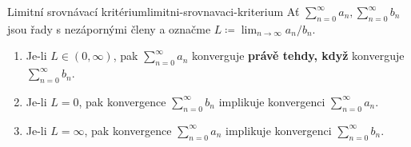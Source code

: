 \begin{theorem}{Limitní srovnávací kritérium}{limitni-srovnavaci-kriterium}
 Ať $\sum_{n = 0}^{\infty} a_n, \sum_{n = 0}^{\infty} b_n$ jsou řady s
 nezápornými členy a označme $L \coloneqq \lim_{n \to \infty} a_n / b_n$.
 \begin{enumerate}[label=(\alph*)]
  \item Je-li $L \in (0,\infty)$, pak $\sum_{n = 0}^{\infty} a_n$ konverguje
   \textbf{právě tehdy, když} konverguje $\sum_{n = 0}^{\infty} b_n$.
  \item Je-li $L = 0$, pak konvergence $\sum_{n = 0}^{\infty} b_n$ implikuje
   konvergenci $\sum_{n = 0}^{\infty} a_n$.
  \item Je-li $L = \infty$, pak konvergence $\sum_{n = 0}^{\infty} a_n$
   implikuje konvergenci $\sum_{n = 0}^{\infty} b_n$.
 \end{enumerate}
\end{theorem}
